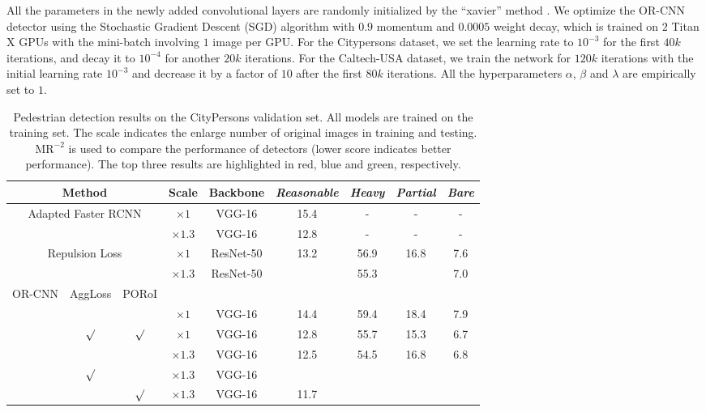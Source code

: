 \documentclass[runningheads]{llncs}
\begin{document}
All the parameters in the newly added convolutional layers are randomly initialized by the ``xavier'' method \cite{DBLP:journals/jmlr/GlorotB10}. We optimize the OR-CNN detector using the Stochastic Gradient Descent (SGD) algorithm with $0.9$ momentum and $0.0005$ weight decay, which is trained on $2$ Titan X GPUs with the mini-batch involving $1$ image per GPU. For the Citypersons dataset, we set the learning rate to $10^{-3}$ for the first $40k$ iterations, and decay it to $10^{-4}$ for another $20k$ iterations. For the Caltech-USA dataset, we train the network for $120k$ iterations with the initial learning rate $10^{-3}$ and decrease it by a factor of $10$ after the first $80k$ iterations. All the hyperparameters $\alpha$, $\beta$ and $\lambda$ are empirically set to $1$.


\begin{table*}[t]
\centering
\caption{Pedestrian detection results on the CityPersons validation set. All models are trained on the training set. The scale indicates the enlarge number of original images in training and testing. $\text{MR}^{-2}$ is used to compare the performance of detectors (lower score indicates better performance). The top three results are highlighted in red, blue and green, respectively. }
\small \setlength{\tabcolsep}{3.5pt}
\begin{tabular}{c|cc|c|c|c|ccc}
\toprule[1.5pt]
\multicolumn{3}{c|}{Method}   &Scale &Backbone &{\em Reasonable} &{\em Heavy} &{\em Partial} &{\em Bare} \\
\hline
\multicolumn{3}{c|}{\multirow{2}{*}{Adapted Faster RCNN \cite{DBLP:conf/cvpr/ZhangBS17}}}                           &$\times1$ &VGG-16 &15.4 &- &- &- \\
\multicolumn{3}{c|}{}                                                                                                                              &$\times1.3$ &VGG-16 &12.8 &- &- &- \\
\multicolumn{3}{c|}{\multirow{2}{*}{Repulsion Loss \cite{DBLP:journals/corr/abs-1711-07752}}}     &$\times1$ &ResNet-50 &13.2 &56.9 &16.8 &7.6 \\
\multicolumn{3}{c|}{}                                                                                                                &$\times1.3$ &ResNet-50 &\color{green}{11.6} &55.3 &\color{green}{14.8} &7.0 \\
\hline
\hline
\multirow{7}{*}{OR-CNN} &AggLoss &PORoI & & & & & &  \\
\cline{2-3}
&  & &$\times1$ &VGG-16 &14.4 &59.4 &18.4 &7.9  \\
&$\surd$ &$\surd$  &$\times1$ &VGG-16 &12.8 &55.7 &15.3 &6.7  \\
&  & &$\times1.3$ &VGG-16 &12.5 &54.5 &16.8 &6.8  \\
&$\surd$ &  &$\times1.3$ &VGG-16 &\color{blue}{11.4} &\color{blue}{52.6} &\color{blue}{13.8} &\color{blue}{6.2} \\
& &$\surd$  &$\times1.3$ &VGG-16 &11.7 &\color{green}{53.0} &\color{green}{14.8} &\color{green}{6.6} \\


\end{tabular}
\end{table*}
\end{document}

